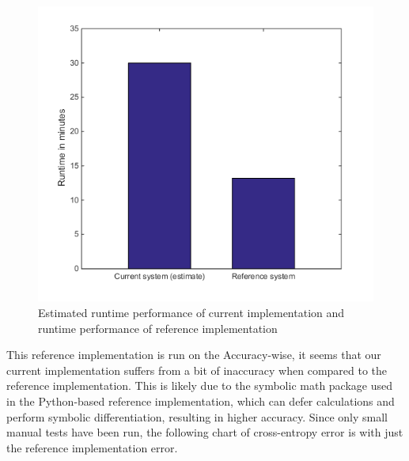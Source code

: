 \documentclass{sig-alternate}
\begin{document}
\begin{figure}[h]
	\begin{center}
		\includegraphics[width=1\linewidth]{performance.png}
	\end{center}
	\vspace{-12pt}
	\caption{Estimated runtime performance of current implementation and runtime performance of reference implementation}
	\label{fig:performance}
\end{figure}

This reference implementation is run on the 
Accuracy-wise, it seems that our current implementation suffers from a bit of inaccuracy
when compared to the reference implementation. This is likely due to the symbolic math
package used in the Python-based reference implementation, which can defer calculations
and perform symbolic differentiation, resulting in higher accuracy. Since only
small manual tests have been run, the following chart of cross-entropy error is with just the
reference implementation error. 
\end{document}
